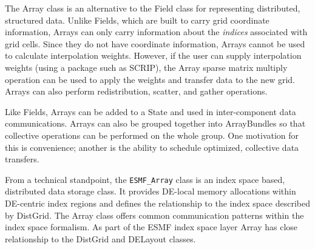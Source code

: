 
The Array class is an alternative to the Field class for representing distributed, structured data.  Unlike Fields, which are built to carry grid coordinate information, Arrays can only carry information about the {\it indices} associated with grid cells.  Since they do not have coordinate information, Arrays cannot be used to calculate interpolation weights.  However, if the user can supply interpolation weights (using a package such as SCRIP), the Array sparse matrix multiply operation can be used to apply the weights and transfer data to the new grid.  Arrays can also perform redistribution, scatter, and gather operations.

Like Fields, Arrays can be added to a State and used in inter-component data communications.  Arrays can also be grouped together into ArrayBundles so that collective operations can be performed on the whole group.  One motivation for this is convenience; another is the ability to schedule optimized, collective data transfers.   

From a technical standpoint, the {\tt ESMF\_Array} class is an index space based, distributed data storage class. It provides DE-local memory allocations within DE-centric index regions and defines the relationship to the index space described by DistGrid. The Array class offers common communication patterns within the index space formalism. As part of the ESMF index space layer Array has close relationship to the DistGrid and DELayout classes.
